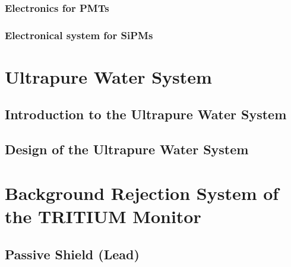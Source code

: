 \documentclass[12pt,a4paper]{book}
\begin{document}
			\subsubsection[Electronic Readout for PMTs]{Electronics for PMTs}\label{subsubsec:PMTsElectronicalSystem}
			
			
			\subsubsection[Electronic Readout for SiPMs]{Electronical system for SiPMs}\label{subsubsec:SiPMsElectronicalSystem}
			
		
	\section{Ultrapure Water System}\label{sec:UltraPureWaterSystem}
		
		\subsection[Introduction to the Water System]{Introduction to the Ultrapure Water System}\label{subsec:IntroductionWaterSystem}
		 
					
		\subsection[Water System Design]{Design of the Ultrapure Water System}\label{subsec:SetUpWaterSystem}
		
	
	\section[Background Rejection System]{Background Rejection System of the TRITIUM Monitor}\label{sec:IntroductionBackground}
	 
	
		\subsection{Passive Shield (Lead)}\label{subsec:SetUpPassiveShield}
		
		
\end{document}
